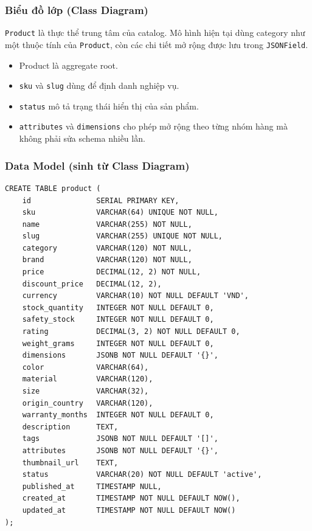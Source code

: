 \documentclass[12pt,a4paper]{article}
\begin{document}
\subsubsection{Biểu đồ lớp (Class Diagram)}
\texttt{Product} là thực thể trung tâm của catalog. Mô hình hiện tại dùng category như một thuộc tính của \texttt{Product}, còn các chi tiết mở rộng được lưu trong \texttt{JSONField}.

\begin{itemize}
  \item Product là aggregate root.
  \item \texttt{sku} và \texttt{slug} dùng để định danh nghiệp vụ.
  \item \texttt{status} mô tả trạng thái hiển thị của sản phẩm.
  \item \texttt{attributes} và \texttt{dimensions} cho phép mở rộng theo từng nhóm hàng mà không phải sửa schema nhiều lần.
\end{itemize}

\subsubsection{Data Model (sinh từ Class Diagram)}
\begin{lstlisting}[style=code,caption={Data model rút gọn của Product Service}]
CREATE TABLE product (
    id               SERIAL PRIMARY KEY,
    sku              VARCHAR(64) UNIQUE NOT NULL,
    name             VARCHAR(255) NOT NULL,
    slug             VARCHAR(255) UNIQUE NOT NULL,
    category         VARCHAR(120) NOT NULL,
    brand            VARCHAR(120) NOT NULL,
    price            DECIMAL(12, 2) NOT NULL,
    discount_price   DECIMAL(12, 2),
    currency         VARCHAR(10) NOT NULL DEFAULT 'VND',
    stock_quantity   INTEGER NOT NULL DEFAULT 0,
    safety_stock     INTEGER NOT NULL DEFAULT 0,
    rating           DECIMAL(3, 2) NOT NULL DEFAULT 0,
    weight_grams     INTEGER NOT NULL DEFAULT 0,
    dimensions       JSONB NOT NULL DEFAULT '{}',
    color            VARCHAR(64),
    material         VARCHAR(120),
    size             VARCHAR(32),
    origin_country   VARCHAR(120),
    warranty_months  INTEGER NOT NULL DEFAULT 0,
    description      TEXT,
    tags             JSONB NOT NULL DEFAULT '[]',
    attributes       JSONB NOT NULL DEFAULT '{}',
    thumbnail_url    TEXT,
    status           VARCHAR(20) NOT NULL DEFAULT 'active',
    published_at     TIMESTAMP NULL,
    created_at       TIMESTAMP NOT NULL DEFAULT NOW(),
    updated_at       TIMESTAMP NOT NULL DEFAULT NOW()
);
\end{lstlisting}
\end{document}
